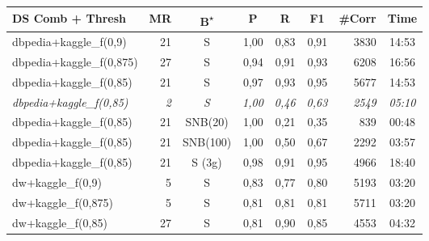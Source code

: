 \documentclass[11pt,titlepage,oneside,openany]{book}
\begin{document}
\begin{table}[]
	\small
	\begin{tabular}{lrcrrrrc}
		DS Comb + Thresh                 & \multicolumn{1}{c}{MR} & B\textsuperscript{$\star$}          & \multicolumn{1}{c}{P} & \multicolumn{1}{c}{R} & \multicolumn{1}{c}{F1} & \multicolumn{1}{c}{\#Corr} & Time           \\\hline
		dbpedia+kaggle\_f(0,9)           & 21                     & S          & 1,00                  & 0,83                  & 0,91                   & 3830                       & 14:53          \\
		dbpedia+kaggle\_f(0,875)         & 27                     & S          & 0,94                  & 0,91                  & 0,93                   & 6208                       & 16:56          \\
		dbpedia+kaggle\_f(0,85)          & 21                     & S          & 0,97                  & 0,93                  & 0,95                   & 5677                       & 14:53          \\
		\textit{dbpedia+kaggle\_f(0,85)} & \textit{2}             & \textit{S} & \textit{1,00}         & \textit{0,46}         & \textit{0,63}          & \textit{2549}              & \textit{05:10} \\
		dbpedia+kaggle\_f(0,85)          & 21                     & SNB(20)    & 1,00                  & 0,21                  & 0,35                   & 839                        & 00:48          \\
		dbpedia+kaggle\_f(0,85)          & 21                     & SNB(100)   & 1,00                  & 0,50                  & 0,67                   & 2292                       & 03:57          \\
		dbpedia+kaggle\_f(0,85)          & 21                     & S (3g)     & 0,98                  & 0,91                  & 0,95                   & 4966                       & 18:40          \\\hdashline
		dw+kaggle\_f(0,9)                & 5                      & S          & 0,83                  & 0,77                  & 0,80                   & 5193                       & 03:20          \\
		dw+kaggle\_f(0,875)              & 5                      & S          & 0,81                  & 0,81                  & 0,81                   & 5711                       & 03:20          \\
		dw+kaggle\_f(0,85)      & 27           & S & 0,81        & 0,90         & 0,85          & 4553             & 04:32 \\

\end{tabular}
\end{table}
\end{document}
